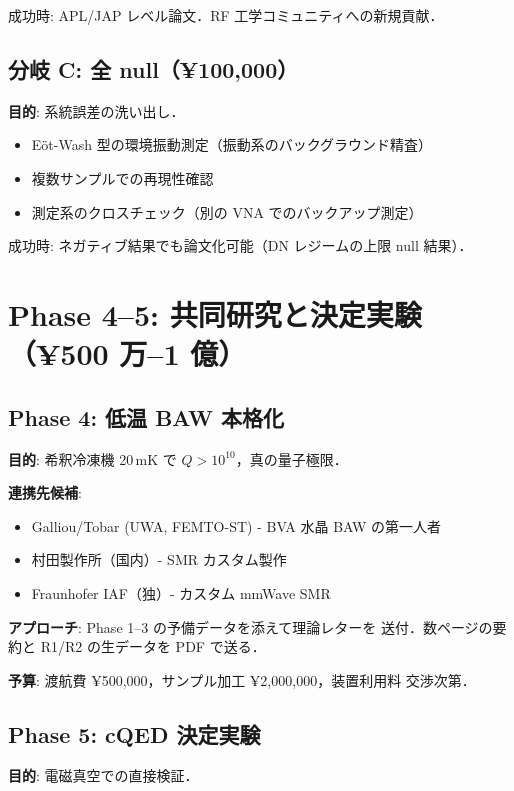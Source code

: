 \documentclass[11pt,a4paper]{article}
\begin{document}
成功時: APL/JAP レベル論文．RF 工学コミュニティへの新規貢献．

\subsection{分岐 C: 全 null（¥100,000）}

\textbf{目的}: 系統誤差の洗い出し．

\begin{itemize}
\item Eöt-Wash 型の環境振動測定（振動系のバックグラウンド精査）
\item 複数サンプルでの再現性確認
\item 測定系のクロスチェック（別の VNA でのバックアップ測定）
\end{itemize}

成功時: ネガティブ結果でも論文化可能（DN レジームの上限 null
結果）．

\section{Phase 4--5: 共同研究と決定実験（¥500 万--1 億）}

\subsection{Phase 4: 低温 BAW 本格化}

\textbf{目的}: 希釈冷凍機 20\,mK で $Q > 10^{10}$，真の量子極限．

\textbf{連携先候補}:
\begin{itemize}
\item Galliou/Tobar (UWA, FEMTO-ST) - BVA 水晶 BAW の第一人者
\item 村田製作所（国内）- SMR カスタム製作
\item Fraunhofer IAF（独）- カスタム mmWave SMR
\end{itemize}

\textbf{アプローチ}: Phase 1--3 の予備データを添えて理論レターを
送付．数ページの要約と R1/R2 の生データを PDF で送る．

\textbf{予算}: 渡航費 ¥500,000，サンプル加工 ¥2,000,000，装置利用料
交渉次第．

\subsection{Phase 5: cQED 決定実験}

\textbf{目的}: 電磁真空での直接検証．
\end{document}

